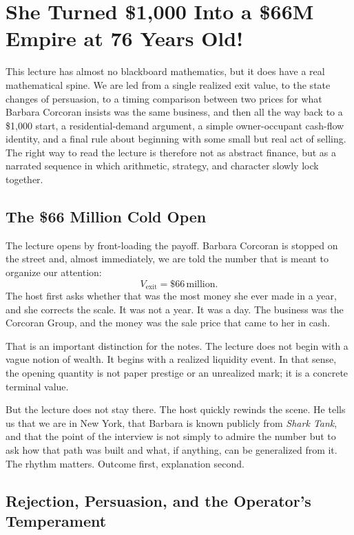 \chapter{She Turned \$1{,}000 Into a \$66M Empire at 76 Years Old!}

This lecture has almost no blackboard mathematics, but it does have a real mathematical spine. We are led from a single realized exit value, to the state changes of persuasion, to a timing comparison between two prices for what Barbara Corcoran insists was the same business, and then all the way back to a \$1{,}000 start, a residential-demand argument, a simple owner-occupant cash-flow identity, and a final rule about beginning with some small but real act of selling. The right way to read the lecture is therefore not as abstract finance, but as a narrated sequence in which arithmetic, strategy, and character slowly lock together.

\section{The \$66 Million Cold Open}

The lecture opens by front-loading the payoff. Barbara Corcoran is stopped on the street and, almost immediately, we are told the number that is meant to organize our attention:
\begin{equation}
V_{\text{exit}}=\$66\,\text{million}.
\end{equation}
The host first asks whether that was the most money she ever made in a year, and she corrects the scale. It was not a year. It was a day. The business was the Corcoran Group, and the money was the sale price that came to her in cash.

That is an important distinction for the notes. The lecture does not begin with a vague notion of wealth. It begins with a realized liquidity event. In that sense, the opening quantity is not paper prestige or an unrealized mark; it is a concrete terminal value.

But the lecture does not stay there. The host quickly rewinds the scene. He tells us that we are in New York, that Barbara is known publicly from \emph{Shark Tank}, and that the point of the interview is not simply to admire the number but to ask how that path was built and what, if anything, can be generalized from it. The rhythm matters. Outcome first, explanation second.

\section{Rejection, Persuasion, and the Operator's Temperament}

